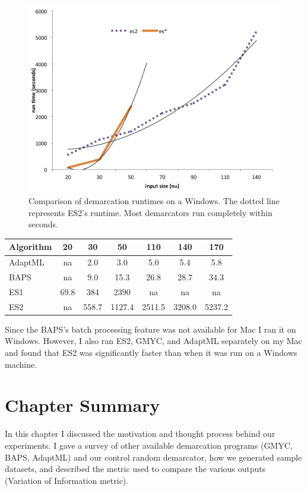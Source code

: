\begin{figure}[h!]
  \centering
    \includegraphics[scale=0.7]{images/SpeedWindows-CH4}
      \caption[Demarcation run time test on Windows.]{Comparison of demarcation runtimes on a Windows. The dotted line represents ES2's runtime. Most demarcators run completely within seconds.}
    \label{fig:WindowsSpeed}
\end{figure}


\begin{table}
    \begin{tabular}{l|cccccc}
    Algorithm & 20   & 30    & 50     & 110    & 140    & 170    \\ \hline
    AdaptML   & na   & 2.0   & 3.0    & 5.0    & 5.4    & 5.8    \\
    BAPS      & na   & 9.0   & 15.3   & 26.8   & 28.7   & 34.3   \\
    ES1       & 69.8 & 384   & 2390   & na     & na     & na     \\
    ES2       & na   & 558.7 & 1127.4 & 2511.5 & 3208.0 & 5237.2 \\
    \end{tabular}
\end{table}


Since the BAPS's batch processing feature was not available for Mac I ran it on Windows.
However, I also ran ES2, GMYC, and AdaptML separately on my Mac and found that ES2 was significantly faster than when it was run on a Windows machine.

\section{Chapter Summary}
In this chapter I discussed the motivation and thought process behind our experiments.
I gave a survey of other available demarcation programs (GMYC, BAPS, AdaptML) and our control random demarcator, how we generated sample datasets, and described the metric used to compare the various outputs (Variation of Information metric).

